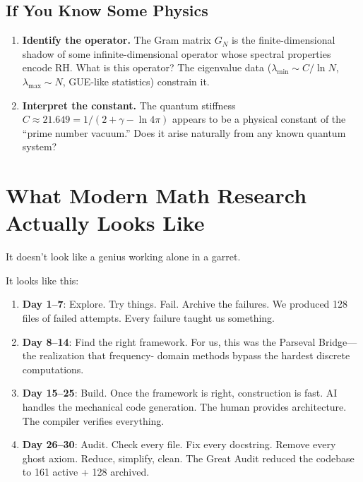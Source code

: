 \documentclass[11pt,a4paper]{article}
\begin{document}
\subsection*{If You Know Some Physics}

\begin{enumerate}
  \item \textbf{Identify the operator.} The Gram matrix $G_N$ is
    the finite-dimensional shadow of some infinite-dimensional
    operator whose spectral properties encode RH. What is this
    operator? The eigenvalue data ($\lambda_{\min} \sim C/\ln N$,
    $\lambda_{\max} \sim N$, GUE-like statistics) constrain it.

  \item \textbf{Interpret the constant.} The quantum stiffness
    $C \approx 21.649 = 1/(2 + \gamma - \ln 4\pi)$ appears to
    be a physical constant of the ``prime number vacuum.'' Does
    it arise naturally from any known quantum system?
\end{enumerate}

\section*{What Modern Math Research Actually Looks Like}

It doesn't look like a genius working alone in a garret.

It looks like this:

\begin{enumerate}
  \item \textbf{Day 1--7}: Explore. Try things. Fail. Archive
    the failures. We produced 128 files of failed attempts. Every
    failure taught us something.

  \item \textbf{Day 8--14}: Find the right framework. For us,
    this was the Parseval Bridge---the realization that frequency-
    domain methods bypass the hardest discrete computations.

  \item \textbf{Day 15--25}: Build. Once the framework is right,
    construction is fast. AI handles the mechanical code generation.
    The human provides architecture. The compiler verifies
    everything.

  \item \textbf{Day 26--30}: Audit. Check every file. Fix every
    docstring. Remove every ghost axiom. Reduce, simplify, clean.
    The Great Audit reduced the codebase to 161 active + 128 archived.
\end{enumerate}
\end{document}
